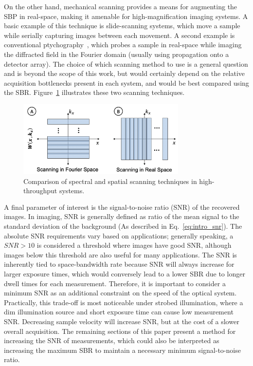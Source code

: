 On the other hand, mechanical scanning provides a means for augmenting the SBP in real-space, making it amenable for high-magnification imaging systems. A basic example of this technique is slide-scanning systems, which move a sample while serially capturing images between each movement. A second example is conventional ptychography~\cite{rodenburg2004phase}, which probes a sample in real-space while imaging the diffracted field in the Fourier domain (usually using propagation onto a detector array). The choice of which scanning method to use is a general question and is beyond the scope of this work, but would certainly depend on the relative acquisition bottlenecks present in each system, and would be best compared using the SBR. Figure~\ref{fig:highthroughput_scanning} illustrates these two scanning techniques.

\begin{figure}
  \centering
    \includegraphics[width=0.75\textwidth]{figures/fig_highthroughput_scanning.png}
  \caption{\label{fig:highthroughput_scanning} Comparison of spectral and spatial scanning techniques in high-throughput systems.}
\end{figure}

A final parameter of interest is the signal-to-noise ratio (SNR) of the recovered images. In imaging, SNR is generally defined as ratio of the mean signal to the standard deviation of the background (As described in Eq.~\ref{eq:intro_snr}). The absolute SNR requirements vary based on applications; generally speaking, a $SNR > 10$ is considered a threshold where images have good SNR, although images below this threshold are also useful for many applications. The SNR is inherently tied to space-bandwidth rate because SNR will always increase for larger exposure times, which would conversely lead to a lower SBR due to longer dwell times for each measurement. Therefore, it is important to consider a minimum SNR as an additional constraint on the speed of the optical system. Practically, this trade-off is most noticeable under strobed illumination, where a dim illumination source and short exposure time can cause low measurement SNR. Decreasing sample velocity will increase SNR, but at the cost of a slower overall acquisition. The remaining sections of this paper present a method for increasing the SNR of measurements, which could also be interpreted as increasing the maximum SBR to maintain a necessary minimum signal-to-noise ratio.

